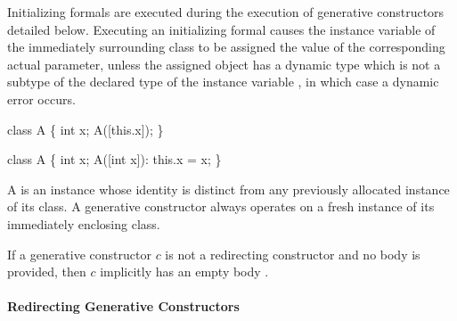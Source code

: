 \documentclass[makeidx]{article}
\begin{document}

\LMHash{}%
Initializing formals are executed during
the execution of generative constructors detailed below.
Executing an initializing formal 
causes the instance variable \id{} of the immediately surrounding class
to be assigned the value of the corresponding actual parameter,
unless the assigned object has a dynamic type
which is not a subtype of the declared type of the instance variable \id{},
in which case a dynamic error occurs.


\begin{dartCode}
class A \{
  int x;
  A([this.x]);
\}
\end{dartCode}


\begin{dartCode}
class A \{
  int x;
  A([int x]): this.x = x;
\}
\end{dartCode}

\LMHash{}%
A  is an instance whose identity is distinct from any previously allocated instance of its class.
A generative constructor always operates on a fresh instance of its immediately enclosing class.


\LMHash{}%
If a generative constructor $c$ is not a redirecting constructor and no body is provided, then $c$ implicitly has an empty body \code{\{\}}.


\paragraph{Redirecting Generative Constructors}
\end{document}
